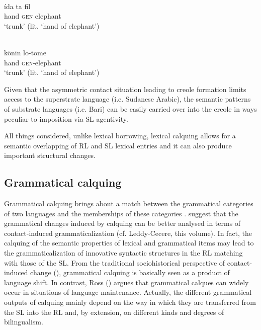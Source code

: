\documentclass[output=paper]{langsci/langscibook}
\begin{document}
\ea\label{eleph}
 \\
\gll   ída ta fil\\
       hand \textsc{gen} elephant \\
\glt   `trunk’ (lit. ‘hand of elephant’)

\\
\gll   könin lo-tome\\
       hand \textsc{gen}-elephant \\
\glt   `trunk’ (lit. ‘hand of elephant’)
\z
\z

Given that the asymmetric contact situation leading to creole formation limits access to the superstrate language (i.e. Sudanese Arabic), the semantic patterns of substrate languages (i.e. Bari) can be easily carried over into the creole in ways peculiar to imposition via SL agentivity. 

All things considered, unlike lexical borrowing, lexical calquing allows for a semantic overlapping of RL and SL lexical entries and it can also produce important structural changes. 


 
 \subsection{Grammatical calquing}\label{sec:gra}

Grammatical calquing brings about a match between the grammatical categories of two languages and the memberships of these categories \citep[132]{Ross2007}. \citet{HeineKuteva2005} suggest that the grammatical changes induced by calquing can be better analysed in terms of contact-induced grammaticalization (cf. Leddy-Cecere, this volume). In fact, the calquing of the semantic properties of lexical and grammatical items may lead to the grammaticalization of innovative syntactic structures in the RL matching with those of the SL. From the traditional sociohistorical perspective of contact-induced change (\citealt{ThomasonKaufman1988}), grammatical calquing is basically seen as a product of language shift. In contrast, Ross (\citeyear[131]{Ross2007}) argues that grammatical calques can widely occur in situations of language maintenance. Actually, the different grammatical outputs of calquing mainly depend on the way in which they are transferred from the SL into the RL and, by extension, on different kinds and degrees of bilingualism.   
\end{document}
